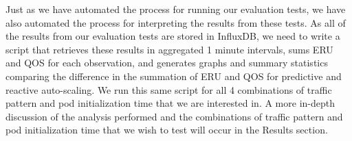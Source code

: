 Just as we have automated the process for running our evaluation tests, we have
also automated the process for interpreting the results from these tests. As all
of the results from our evaluation tests are stored in InfluxDB, we need to
write a script that retrieves these results in aggregated 1 minute intervals,
sums ERU and QOS for each observation, and generates graphs and summary
statistics comparing the difference in the summation of ERU and QOS for
predictive and reactive auto-scaling. We run this same script for all 4
combinations of traffic pattern and pod initialization time that we are
interested in. A more in-depth discussion of the analysis performed and the
combinations of traffic pattern and pod initialization time that we wish to test
will occur in the Results section.
